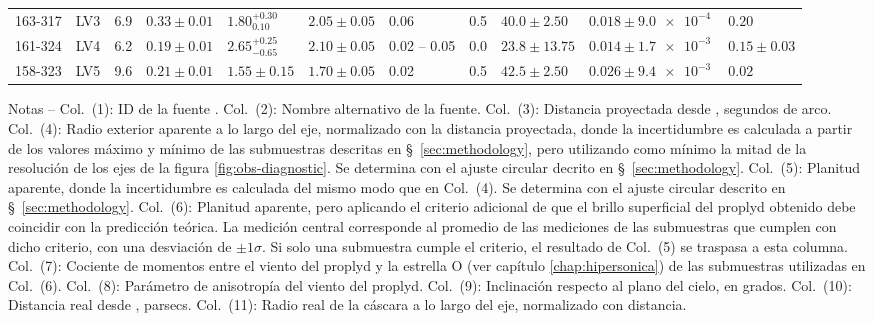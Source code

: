 \begin{landscape}
\begin{table}
\begin{adjustbox}{width=1.35\textwidth}
\begin{tabular}{llrllllrlll}
  163-317  & LV3      &   6.9  &  $0.33 \pm 0.01$  &  $1.80^{+0.30}_{0.10}$   &  $2.05 \pm 0.05$     &  0.06  &  0.5  &  $40.0 \pm 2.50$   &  $0.018 \pm \SI{9.0e-4}{}$  &  $0.20$  \\
 161-324  & LV4      &   6.2  &  $0.19 \pm 0.01$  &  $2.65^{+0.25}_{-0.65}$   &  $2.10 \pm 0.05$     &  0.02 -- 0.05  &  0.0  &  $23.8 \pm 13.75$  &  $0.014 \pm \SI{1.7e-3}{}$  &  $0.15 \pm 0.03$  \\
 158-323  & LV5      &   9.6  &  $0.21 \pm 0.01$  &  $1.55 \pm 0.15$   &  $1.70 \pm 0.05$     &  0.02  &  0.5  &  $42.5 \pm 2.50$   &  $0.026 \pm \SI{9.4e-3}{}$  &  $0.02$  \\
\bottomrule
\end{tabular}
\end{adjustbox}
\begin{minipage}{0.95\linewidth}
\footnotesize
  Notas --
%
  Col.~(1): ID de la fuente \citep{ODell:1994a}.
%
  Col.~(2): Nombre alternativo de la fuente.
% 
  Col.~(3): Distancia proyectada desde \thC{}, segundos de arco.
%
  Col.~(4): Radio exterior aparente a lo largo del eje, normalizado con la distancia proyectada, donde la incertidumbre es calculada a partir de los valores máximo y mínimo de las submuestras descritas en \S~\ref{sec:methodology}, pero utilizando como mínimo la mitad de la resolución de los ejes de la figura \ref{fig:obs-diagnostic}. Se determina con el ajuste circular decrito en \S~\ref{sec:methodology}.
% 
  Col.~(5): Planitud aparente, donde la incertidumbre es calculada del mismo modo que en Col.~(4). Se determina con el ajuste circular descrito en \S~\ref{sec:methodology}.
% 
  Col.~(6): Planitud aparente, pero aplicando el criterio adicional de que el brillo superficial del proplyd obtenido debe coincidir con la predicción teórica. La medición central corresponde al promedio de las mediciones de las submuestras que cumplen con dicho criterio, con una desviación de $\pm 1\sigma$. Si solo una submuestra cumple el criterio, el resultado de Col.~(5) se traspasa a esta columna. 
%
  Col.~(7): Cociente de momentos entre el viento del proplyd y la estrella O (ver capítulo \ref{chap:hipersonica}) de las submuestras utilizadas en Col.~(6). 
% 
  Col.~(8): Parámetro de anisotropía del viento del proplyd.
% 
  Col.~(9): Inclinación respecto al plano del cielo, en grados.
% 
  Col.~(10): Distancia real desde \thC{}, parsecs.
%
  Col.~(11): Radio real de la cáscara a lo largo del eje, normalizado con distancia.

\end{minipage}
\end{table}
\end{landscape}

